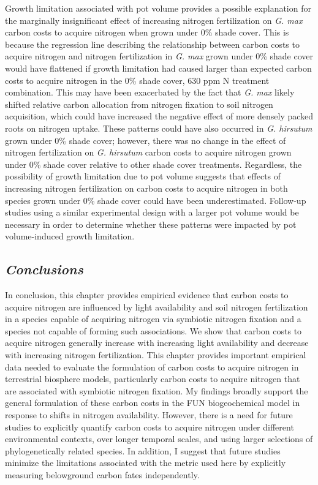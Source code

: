 Growth limitation associated with pot volume provides a possible explanation for the marginally insignificant effect of increasing nitrogen fertilization on \textit{G. max} carbon costs to acquire nitrogen when grown under 0\% shade cover. This is because the regression line describing the relationship between carbon costs to acquire nitrogen and nitrogen fertilization in \textit{G. max} grown under 0\% shade cover would have flattened if growth limitation had caused larger than expected carbon costs to acquire nitrogen in the 0\% shade cover, 630 ppm N treatment combination. This may have been exacerbated by the fact that \textit{G. max} likely shifted relative carbon allocation from nitrogen fixation to soil nitrogen acquisition, which could have increased the negative effect of more densely packed roots on nitrogen uptake. These patterns could have also occurred in \textit{G. hirsutum} grown under 0\% shade cover; however, there was no change in the effect of nitrogen fertilization on \textit{G. hirsutum} carbon costs to acquire nitrogen grown under 0\% shade cover relative to other shade cover treatments. Regardless, the possibility of growth limitation due to pot volume suggests that effects of increasing nitrogen fertilization on carbon costs to acquire nitrogen in both species grown under 0\% shade cover could have been underestimated. Follow-up studies using a similar experimental design with a larger pot volume would be necessary in order to determine whether these patterns were impacted by pot volume-induced growth limitation.

\subsection{\textit{Conclusions}}
\noindent In conclusion, this chapter provides empirical evidence that carbon costs to acquire nitrogen are influenced by light availability and soil nitrogen fertilization in a species capable of acquiring nitrogen via symbiotic nitrogen fixation and a species not capable of forming such associations. We show that carbon costs to acquire nitrogen generally increase with increasing light availability and decrease with increasing nitrogen fertilization. This chapter provides important empirical data needed to evaluate the formulation of carbon costs to acquire nitrogen in terrestrial biosphere models, particularly carbon costs to acquire nitrogen that are associated with symbiotic nitrogen fixation. My findings broadly support the general formulation of these carbon costs in the FUN biogeochemical model in response to shifts in nitrogen availability. However, there is a need for future studies to explicitly quantify carbon costs to acquire nitrogen under different environmental contexts, over longer temporal scales, and using larger selections of phylogenetically related species. In addition, I suggest that future studies minimize the limitations associated with the metric used here by explicitly measuring belowground carbon fates independently.